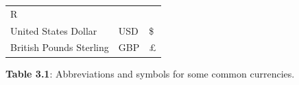 {{\begin{center}
\begin{xtabular}[t]{|l|l|l|}
    
        R%
     \tabularnewline{}
    
    
        United States Dollar &
    
    
        USD &
    
    
        \$%
     \tabularnewline{}
    
    
        British Pounds Sterling &
    
    
        GBP &
    
    
        £%
     \tabularnewline{}
    \end{xtabular}
      \end{center}
    \begin{center}{\small\bfseries Table 3.1}: Abbreviations and symbols for some common currencies.\end{center}
    
}}
